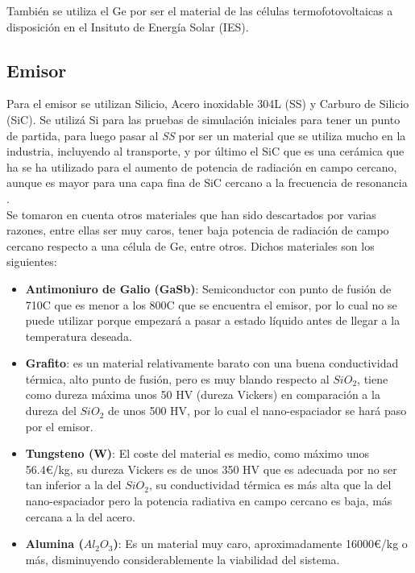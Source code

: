 También se utiliza el Ge por ser el material de las células termofotovoltaicas a disposición en el Insituto de Energía Solar (IES).
\subsection{Emisor}
Para el emisor se utilizan Silicio, Acero inoxidable 304L (SS) y Carburo de Silicio (SiC). Se utilizá Si para las pruebas de simulación iniciales para tener un punto de partida, para luego pasar al \textit{SS} por ser un material que se utiliza mucho en la industria, incluyendo al transporte, y por último el SiC que es una cerámica que ha se ha utilizado para el aumento de potencia de radiación en campo cercano, aunque es mayor para una capa fina de SiC cercano a la frecuencia de resonancia \cite{doi:Near_field_ThinFilm}.\\


Se tomaron en cuenta otros materiales que han sido descartados por varias razones, entre ellas ser muy caros, tener baja potencia de radiación de campo cercano respecto a una célula de Ge, entre otros. %
Dichos materiales son los siguientes:

\begin{itemize}
	\item \textbf{Antimoniuro de Galio (GaSb)}: Semiconductor con punto de fusión de 710\textdegree C que es menor a los 800\textdegree C que se encuentra el emisor, por lo cual no se puede utilizar porque empezará a pasar a estado líquido antes de llegar a la temperatura deseada.
	\item \textbf{Grafito}: es un material relativamente barato con una buena conductividad térmica, alto punto de fusión, pero es muy blando respecto al $SiO_2$, tiene como dureza máxima unos 50 HV (dureza Vickers) en comparación a la dureza del $SiO_2$ de unos 500 HV, por lo cual el nano-espaciador se hará paso por el emisor.
	\item \textbf{Tungsteno (W)}: El coste del material es medio, como máximo unos 56.4€/kg, su dureza Vickers es de unos 350 HV que es adecuada por no ser tan inferior a la del $SiO_2$, su conductividad térmica es más alta que la del nano-espaciador pero la potencia radiativa en campo cercano es baja, más cercana a la del acero.
	\item \textbf{Alumina ($Al_2O_3$)}: Es un material muy caro, aproximadamente 16000€/kg o más, disminuyendo considerablemente la viabilidad del sistema.
\end{itemize}

